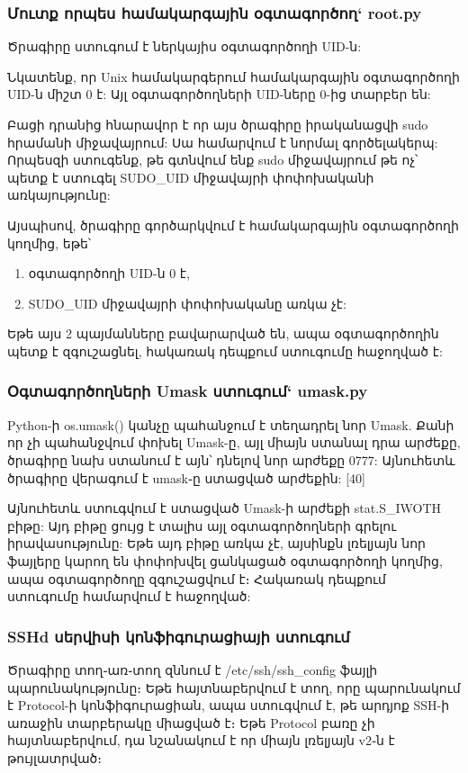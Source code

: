\documentclass[a4paper,12pt]{article}
\begin{document}
\begin{sloppypar}
\subsubsection{Մուտք որպես համակարգային օգտագործող` root.py}


Ծրագիրը ստուգում է ներկայիս օգտագործողի UID-ն:

Նկատենք, որ Unix համակարգերում համակարգային օգտագործողի UID-ն միշտ 0 է:
Այլ օգտագործողների UID-ները 0-ից տարբեր են:

Բացի դրանից հնարավոր է որ այս ծրագիրը իրականացվի sudo հրամանի միջավայրում:
Սա համարվում է նորմալ գործելակերպ: Որպեսզի ստուգենք, թե գտնվում ենք sudo
միջավայրում թե ոչ՝ պետք է ստուգել SUDO\_UID միջավայրի փոփոխականի
առկայությունը:

Այսպիսով, ծրագիրը գործարկվում է համակարգային օգտագործողի կողմից, եթե՝
\begin{enumerate}
\item օգտագործողի UID-ն 0 է,
\item SUDO\_UID միջավայրի փոփոխականը առկա չէ:
\end{enumerate}

Եթե այս 2 պայմանները բավարարված են, ապա օգտագործողին պետք է զգուշացնել,
հակառակ դեպքում ստուգումը հաջողված է:


\subsubsection{Օգտագործողների Umask ստուգում` umask.py}


Python-ի os.umask() կանչը պահանջում է տեղադրել նոր Umask.
Քանի որ չի պահանջվում փոխել Umask-ը, այլ միայն ստանալ դրա արժեքը,
ծրագիրը նախ ստանում է այն՝ դնելով նոր արժեքը 0777: Այնուհետև
ծրագիրը վերագում է umask֊ը ստացված արժեքին: [40]

Այնուհետև ստուգվում է ստացված Umask-ի արժեքի stat.S\_IWOTH բիթը:
Այդ բիթը ցույց է տալիս այլ օգտագործողների գրելու իրավասությունը:
Եթե այդ բիթը առկա չէ, այսինքն լռելյայն նոր ֆայլերը կարող են
փոփոխվել ցանկացած օգտագործողի կողմից, ապա օգտագործողը զգուշացվում է։
Հակառակ դեպքում ստուգումը համարվում է հաջողված:


\subsubsection{SSHd սերվիսի կոնֆիգուրացիայի ստուգում}


Ծրագիրը տող֊առ֊տող զննում է /etc/ssh/ssh\_config ֆայլի պարունակությունը։
Եթե հայտնաբերվում է տող, որը պարունակում է Protocol-ի կոնֆիգուրացիան,
ապա ստուգվում է, թե արդյոք SSH-ի առաջին տարբերակը միացված է։
Եթե Protocol բառը չի հայտնաբերվում, դա նշանակում է որ միայն լռելյայն
v2֊ն է թույլատրված։


\end{sloppypar}
\end{document}
